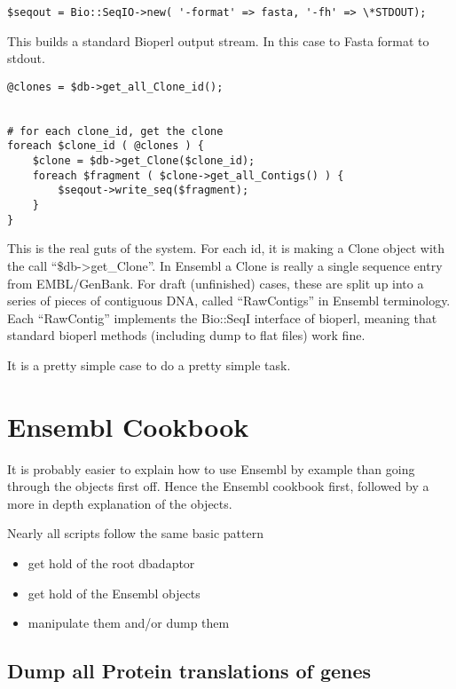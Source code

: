 \documentclass[11pt,a4paper]{article}
\begin{document}
\begin{verbatim}
$seqout = Bio::SeqIO->new( '-format' => fasta, '-fh' => \*STDOUT);
\end{verbatim}

This builds a standard Bioperl output stream. In this case to Fasta format to stdout.

\begin{verbatim}
@clones = $db->get_all_Clone_id();


# for each clone_id, get the clone
foreach $clone_id ( @clones ) {
	$clone = $db->get_Clone($clone_id);
	foreach $fragment ( $clone->get_all_Contigs() ) {
		$seqout->write_seq($fragment);
   	}
}
\end{verbatim}

This is the real guts of the system. For each id, it is making a Clone
object with the call ``\$db->get\_Clone''. In Ensembl a Clone is
really a single sequence entry from EMBL/GenBank. For draft
(unfinished) cases, these are split up into a series of pieces of
contiguous DNA, called ``RawContigs'' in Ensembl terminology. Each
``RawContig'' implements the Bio::SeqI interface of bioperl, meaning
that standard bioperl methods (including dump to flat files) work
fine.


It is a pretty simple case to do a pretty simple task. 

\section{Ensembl Cookbook}


It is probably easier to explain how to use Ensembl by example than going
through the objects first off. Hence the Ensembl cookbook first, followed by 
a more in depth explanation of the objects.

Nearly all scripts follow the same basic pattern

\begin{itemize}
\item get hold of the root dbadaptor 
\item get hold of the Ensembl objects 
\item manipulate them and/or dump them
\end{itemize} 


\subsection{Dump all Protein translations of genes}
\end{document}
